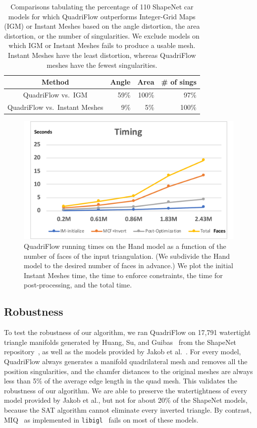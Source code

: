 \begin{table}
\caption{Comparisons tabulating the percentage of 110 ShapeNet car models for which QuadriFlow outperforms Integer-Grid Maps (IGM) or Instant Meshes based on the angle distortion, the area distortion, or the number of singularities. We exclude models on which IGM or Instant Meshes fails to produce a usable mesh. Instant Meshes have the least distortion, whereas QuadriFlow meshes have the fewest singularities.
\label{tab:quad-car-compare}
}

\centering
\begin{tabular}{|c|r|r|r|}
\hline
Method & Angle & Area & \# of sings \\
\hline
QuadriFlow vs.\ IGM & 59\% & 100\% & 97\% \\
\hline
QuadriFlow vs.\ Instant Meshes & 9\% & 5\% & 100\% \\
\hline
\end{tabular}
\end{table}


\begin{figure}
\centering
\includegraphics[width=0.6\linewidth]{quadriflow/diagram/timing.pdf}

\caption{QuadriFlow running times on the Hand model as a function of the number of faces of the input triangulation. (We subdivide the Hand model to the desired number of faces in advance.) We plot the initial Instant Meshes time, the time to enforce constraints, the time for post-processing, and the total time.}
\label{fig:quad-Timing}
\end{figure}
\subsection{Robustness}
\label{quad-robustness}

To test the robustness of our algorithm, we ran QuadriFlow on 17,791 watertight triangle manifolds generated by Huang, Su, and Guibas~\cite{huang2018robust} from the ShapeNet repository~\cite{chang2015shapenet}, as well as the models provided by Jakob et al.~\cite{jakob2015instant}. For every model, QuadriFlow always generates a manifold quadrilateral mesh and removes all the position singularities, and the chamfer distances to the original meshes are always less than 5\% of the average edge length in the quad mesh. This validates the robustness of our algorithm. We are able to preserve the watertightness of every model provided by Jakob et al., but not for about 20\% of the ShapeNet models, because the SAT algorithm cannot eliminate every inverted triangle. By contrast, MIQ~\cite{bommes2009mixed} as implemented in \texttt{libigl}~\cite{jacobson2013libigl} fails on most of these models.

